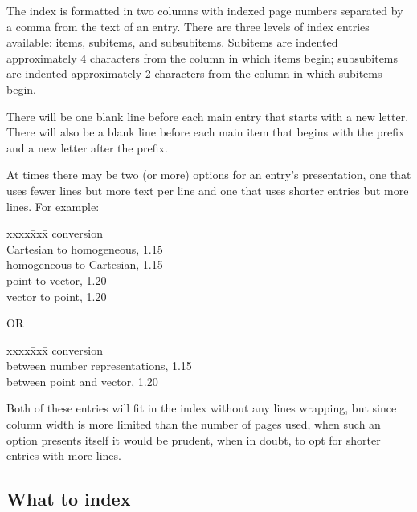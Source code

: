 \documentclass{article}
\newenvironment{indexex}{\begin{tabbing}
xxxx\=xxx\=\kill}{\end{tabbing}}
\begin{document}
The index is formatted in two columns with indexed page numbers 
separated by a comma from the 
text of an entry.  There are three levels of index entries available:
items, subitems, and subsubitems.  Subitems are indented approximately
4 characters from the column in which items begin; subsubitems are indented
approximately 2 characters from the column in which subitems begin. 

There will be one blank line before each main entry that starts with a new 
letter.  There will also be a blank line before each main item that begins
with the  prefix and a new letter after the prefix.

At times there may be two (or more) options for an entry's presentation, one
that uses fewer lines but more text per line and one that uses shorter
entries but more lines.  For example:
        \begin{indexex}
        conversion  \\
        \> Cartesian to homogeneous,      1.15 \\
        \> homogeneous to Cartesian,      1.15 \\
        \> point to vector,               1.20 \\
        \> vector to point,               1.20 
        \end{indexex}

OR
        \begin{indexex}
        conversion  \\
        \> between number representations, 1.15 \\
        \> between point and vector,       1.20 
        \end{indexex}

Both of these entries will fit in the index without any lines wrapping, but 
since column width is more limited than the number of pages used, when such 
an option presents itself it would be prudent, when in doubt, to opt for 
shorter entries with more lines.%

\subsection{What to index}
\label{what_to_index}
\end{document}

